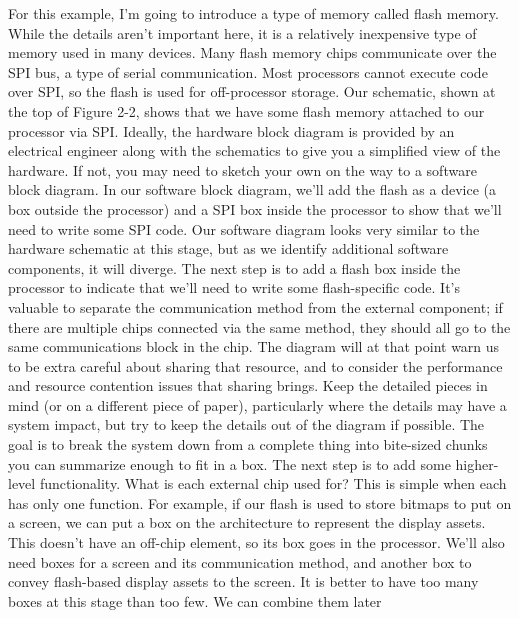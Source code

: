 \documentclass{report}
\begin{document}
\begin{itemize}
            \bigbreak \noindent 
            For this example, I’m going to introduce a type of memory called flash memory. While the details aren’t important here, it is a relatively inexpensive type of memory used in many devices. Many flash memory chips communicate over the SPI bus, a type of serial communication. Most processors cannot execute code over SPI, so the flash is used for off-processor storage. Our schematic, shown at the top of Figure 2-2, shows that we have some flash memory attached to our processor via SPI.
            \bigbreak \noindent 
            Ideally, the hardware block diagram is provided by an electrical engineer along with the schematics to give you a simplified view of the hardware. If not, you may need to sketch your own on the way to a software block diagram.
            \bigbreak \noindent 
            \bigbreak \noindent 
            In our software block diagram, we’ll add the flash as a device (a box outside the processor) and a SPI box inside the processor to show that we’ll need to write some SPI code. Our software diagram looks very similar to the hardware schematic at this stage, but as we identify additional software components, it will diverge.
            \bigbreak \noindent 
            The next step is to add a flash box inside the processor to indicate that we’ll need to write some flash-specific code. It’s valuable to separate the communication method from the external component; if there are multiple chips connected via the same method, they should all go to the same communications block in the chip. The diagram will at that point warn us to be extra careful about sharing that resource, and to consider the performance and resource contention issues that sharing brings.
            \bigbreak \noindent 
            Keep the detailed pieces in mind (or on a different piece of paper), particularly where the details may have a system impact, but try to keep the details out of the diagram if possible. The goal is to break the system down from a complete thing into bite-sized chunks you can summarize enough to fit in a box.
            \bigbreak \noindent 
            The next step is to add some higher-level functionality. What is each external chip used for? This is simple when each has only one function. For example, if our flash is used to store bitmaps to put on a screen, we can put a box on the architecture to represent the display assets. This doesn’t have an off-chip element, so its box goes in the processor. We’ll also need boxes for a screen and its communication method, and another box to convey flash-based display assets to the screen. It is better to have too many boxes at this stage than too few. We can combine them later

\end{itemize}
\end{document}
